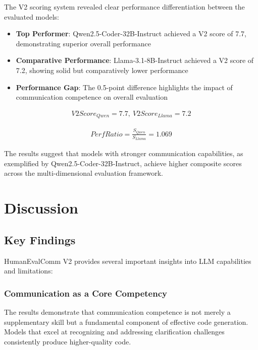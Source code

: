 \documentclass[conference]{IEEEtran}
\begin{document}
The V2 scoring system revealed clear performance differentiation between the evaluated models:

\begin{itemize}
    \item \textbf{Top Performer}: Qwen2.5-Coder-32B-Instruct achieved a V2 score of 7.7, demonstrating superior overall performance
    \item \textbf{Comparative Performance}: Llama-3.1-8B-Instruct achieved a V2 score of 7.2, showing solid but comparatively lower performance
    \item \textbf{Performance Gap}: The 0.5-point difference highlights the impact of communication competence on overall evaluation
\end{itemize}

\begin{align}
    	\mathit{V2Score}_{Qwen} = 7.7,\ \mathit{V2Score}_{Llama} = 7.2
\end{align}

\begin{align}
    	\mathit{PerfRatio} = \frac{S_{Qwen}}{S_{Llama}} = 1.069
\end{align}

The results suggest that models with stronger communication capabilities, as exemplified by Qwen2.5-Coder-32B-Instruct, achieve higher composite scores across the multi-dimensional evaluation framework.

\section{Discussion}

\subsection{Key Findings}

HumanEvalComm V2 provides several important insights into LLM capabilities and limitations:

\subsubsection{Communication as a Core Competency}

The results demonstrate that communication competence is not merely a supplementary skill but a fundamental component of effective code generation. Models that excel at recognizing and addressing clarification challenges consistently produce higher-quality code.
\end{document}
